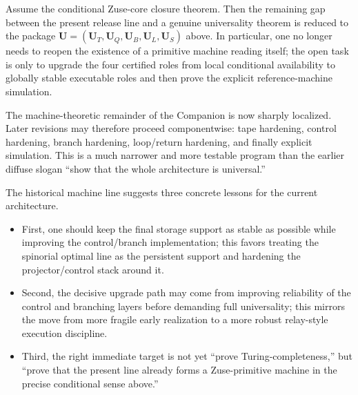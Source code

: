 \begin{proposition}
Assume the conditional Zuse-core closure theorem. Then the remaining gap between the present release line and a genuine universality theorem is reduced to the package $\mathbf U=(\mathbf U_T,\mathbf U_Q,\mathbf U_B,\mathbf U_L,\mathbf U_S)$ above. In particular, one no longer needs to reopen the existence of a primitive machine reading itself; the open task is only to upgrade the four certified roles from local conditional availability to globally stable executable roles and then prove the explicit reference-machine simulation.
\end{proposition}

\begin{corollary}
The machine-theoretic remainder of the Companion is now sharply localized. Later revisions may therefore proceed componentwise: tape hardening, control hardening, branch hardening, loop/return hardening, and finally explicit simulation. This is a much narrower and more testable program than the earlier diffuse slogan ``show that the whole architecture is universal.''
\end{corollary}

\begin{remark}
The historical machine line suggests three concrete lessons for the current architecture.
\begin{itemize}[leftmargin=2em]
 \item First, one should keep the final storage support as stable as possible while improving the control/branch implementation; this favors treating the spinorial optimal line as the persistent support and hardening the projector/control stack around it.
 \item Second, the decisive upgrade path may come from improving reliability of the control and branching layers before demanding full universality; this mirrors the move from more fragile early realization to a more robust relay-style execution discipline.
 \item Third, the right immediate target is not yet ``prove Turing-completeness,'' but ``prove that the present line already forms a Zuse-primitive machine in the precise conditional sense above.''
\end{itemize}
\end{remark}




